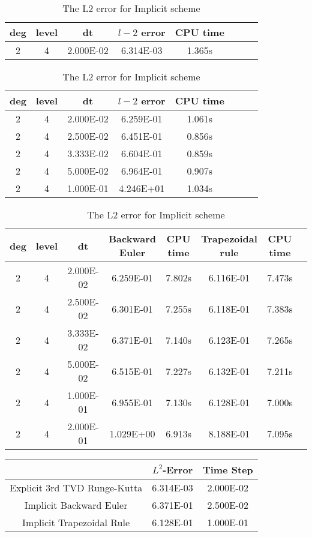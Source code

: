 \documentclass[a4paper]{article}
\begin{document}

\begin{table}[htbp]
\caption{\label{tab:test}3D: The L2 error for Explicit 3rd Runge Kutta with time period=0.5}
\centering
\vspace{5pt}
\begin{tabular}{cccccccc}
\toprule
deg & level&dt&$l-2$ error &CPU time \\
\midrule
2&4&2.000E-02&6.314E-03&1.365s\\
\bottomrule
\end{tabular}
\caption{\label{tab:test}The L2 error for Semi-Implicit Backward Euler}
\centering
\vspace{5pt}

\begin{tabular}{cccccccc}
\toprule
deg & level&dt&$l-2$ error &CPU time \\
\midrule
2&4&2.000E-02&6.259E-01&1.061s\\
2&4&2.500E-02&6.451E-01&0.856s\\
2&4&3.333E-02&6.604E-01&0.859s\\
2&4&5.000E-02&6.964E-01&0.907s\\
2&4&1.000E-01&4.246E+01&1.034s\\
\bottomrule
\end{tabular}


\caption{\label{tab:test}The L2 error for Implicit scheme}
\centering
\vspace{5pt}

\begin{tabular}{cccccccc}
\toprule
deg & level&dt&Backward Euler &CPU time &Trapezoidal rule&CPU time\\
\midrule
2&4&2.000E-02&6.259E-01&7.802s&6.116E-01&7.473s\\
2&4&2.500E-02&6.301E-01&7.255s&6.118E-01&7.383s\\
2&4&3.333E-02&6.371E-01&7.140s&6.123E-01&7.265s\\
2&4&5.000E-02&6.515E-01&7.227s&6.132E-01&7.211s\\
2&4&1.000E-01&6.955E-01&7.130s&6.128E-01&7.000s\\
2&4&2.000E-01&1.029E+00&6.913s&8.188E-01&7.095s\\
\bottomrule
\end{tabular}
\end{table}


\begin{table}
\begin{tabular}{c|c|c}
& $L^2$-Error & Time Step \\ \hline\hline
Explicit 3rd TVD Runge-Kutta  & 6.314E-03 & 2.000E-02\\ \hline
Implicit Backward Euler & 6.371E-01 & 2.500E-02\\ \hline
Implicit Trapezoidal Rule & 6.128E-01 & 1.000E-01\\ \hline
\hline
\end{tabular}
\end{table}
\end{document}
